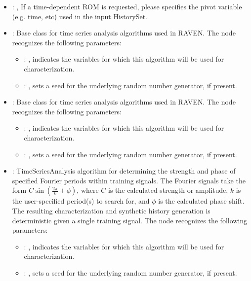 \begin{itemize}
    \item {}: , 
      If a time-dependent ROM is requested, please specifies the pivot         variable (e.g. time,
      etc) used in the input HistorySet.

    \item {}:
      Base class for time series analysis algorithms used in RAVEN.
      The  node recognizes the following parameters:
        \begin{itemize}
          \item {}: , 
            indicates the variables for which this algorithm will be used for characterization.
          \item {}: , 
            sets a seed for the underlying random number generator, if present.
      \end{itemize}

    \item {}:
      Base class for time series analysis algorithms used in RAVEN.
      The  node recognizes the following parameters:
        \begin{itemize}
          \item {}: , 
            indicates the variables for which this algorithm will be used for characterization.
          \item {}: , 
            sets a seed for the underlying random number generator, if present.
      \end{itemize}

    \item {}:
      TimeSeriesAnalysis algorithm for determining the strength and phase of
      specified Fourier periods within training signals. The Fourier signals take
      the form $C\sin(\frac{2\pi}{k}+\phi)$, where $C$ is the calculated strength
      or amplitude, $k$ is the user-specified period(s) to search for, and $\phi$
      is the calculated phase shift. The resulting characterization and synthetic
      history generation is deterministic given a single training signal.
      The  node recognizes the following parameters:
        \begin{itemize}
          \item {}: , 
            indicates the variables for which this algorithm will be used for characterization.
          \item {}: , 
            sets a seed for the underlying random number generator, if present.
      \end{itemize}


\end{itemize}

